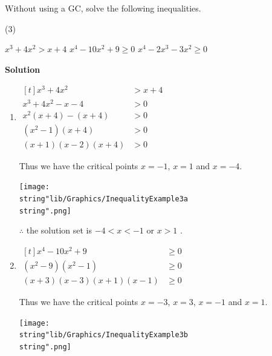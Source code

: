 \documentclass[11pt,a4paper]{book}
\begin{document}
\begin{example}{}

Without using a GC, solve the following inequalities.

\begin{tasks}[label=(\alph*),label-width=3.5ex](3)

\task $x^{3}+4x^{2}>x+4$
\task $x^{4}-10x^{2}+9\geq0$
\task $x^{4}-2x^{3}-3x^{2}\geq0$

\end{tasks}

\textbf{Solution}

\begin{enumerate}[label=(\alph*),itemsep=1cm]

\item
$
\begin{aligned}[t]
x^{3}+4x^{2} & >x+4\\
x^{3}+4x^{2}-x-4 & >0\\
x^{2}\left(x+4\right)-\left(x+4\right) & >0\\
\left(x^{2}-1\right)\left(x+4\right) & >0\\
\left(x+1\right)\left(x-2\right)\left(x+4\right) & >0
\end{aligned}
$

Thus we have the critical points $x=-1$, $x=1$ and $x=-4$.
\begin{center}
\texttt{[image: \\string"lib/Graphics/InequalityExample3a\\string".png]}
\par\end{center}

$\therefore$ the solution set is $-4<x<-1$ or $x>1$ .

\item
$
\begin{aligned}[t]
x^{4}-10x^{2}+9 & \geq0\\
\left(x^{2}-9\right)\left(x^{2}-1\right) & \geq0\\
\left(x+3\right)\left(x-3\right)\left(x+1\right)\left(x-1\right) & \geq0
\end{aligned}
$

Thus we have the critical points $x=-3$, $x=3$, $x=-1$ and $x=1$.
\begin{center}
\texttt{[image: \\string"lib/Graphics/InequalityExample3b\\string".png]}
\par\end{center}


\end{enumerate}
\end{example}
\end{document}

